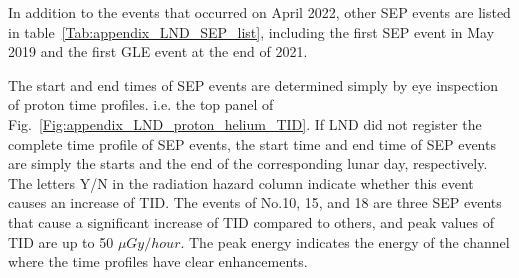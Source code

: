 In addition to the events that occurred on April 2022, other \ac{SEP} events are listed in table~\ref{Tab:appendix_LND_SEP_list}, including the first \ac{SEP} event in May 2019 and the first \ac{GLE} event at the end of 2021.

The start and end times of \ac{SEP} events are determined simply by eye inspection of proton time profiles. i.e. the top panel of Fig.~\ref{Fig:appendix_LND_proton_helium_TID}. If \ac{LND} did not register the complete time profile of \ac{SEP} events, the start time and end time of \ac{SEP} events are simply the starts and the end of the corresponding lunar day, respectively.
The letters Y/N in the radiation hazard column indicate whether this event causes an increase of \ac{TID}. The events of No.10, 15, and 18 are three \ac{SEP} events that cause a significant increase of \ac{TID} compared to others, and peak values of \ac{TID} are up to 50 $\mu Gy/hour$. The peak energy indicates the energy of the channel where the time profiles have clear enhancements.


